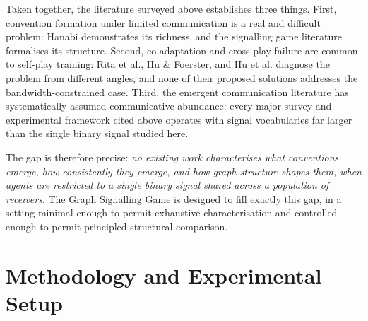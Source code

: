 \documentclass[a4paper,twoside,12pt]{report}
\begin{document}
    Taken together, the literature surveyed above establishes three things.
    First, convention formation under limited communication is a real and
    difficult problem: Hanabi demonstrates its richness, and the signalling
    game literature formalises its structure. Second, co-adaptation and
    cross-play failure are common to self-play training: Rita et al., Hu
    \& Foerster, and Hu et al. diagnose the problem from different angles,
    and none of their proposed solutions addresses the bandwidth-constrained
    case. Third, the emergent communication literature has systematically
    assumed communicative abundance: every major survey and experimental
    framework cited above operates with signal vocabularies far larger than
    the single binary signal studied here.
    
    The gap is therefore precise: \emph{no existing work characterises what
    conventions emerge, how consistently they emerge, and how graph structure
    shapes them, when agents are restricted to a single binary signal shared
    across a population of receivers}. The Graph Signalling Game is designed
    to fill exactly this gap, in a setting minimal enough to permit exhaustive
    characterisation and controlled enough to permit principled structural
    comparison.
    
    
    \chapter{Methodology and Experimental Setup}
    \label{chap:methodology}
    
    
    
    
    
    
\end{document}
